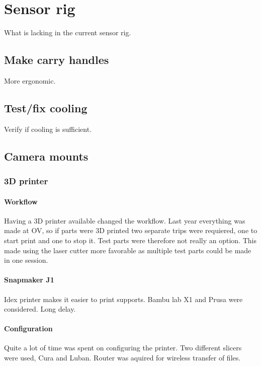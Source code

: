 \chapter{Sensor rig}
What is lacking in the current sensor rig.


\section{Make carry handles}
More ergonomic.

\section{Test/fix cooling}
Verify if cooling is sufficient.

\section{Camera mounts}

\subsection{3D printer}

\subsubsection{Workflow}
Having a 3D printer available changed the workflow.
Last year everything was made at OV, so if parts were 3D printed two separate trips were requiered, one to start print and one to stop it.
Test parts were therefore not really an option.
This made using the laser cutter more favorable as multiple test parts could be made in one session.

\subsubsection{Snapmaker J1}
Idex printer makes it easier to print supports.
Bambu lab X1 and Prusa were considered.
Long delay.

\subsubsection{Configuration}
Quite a lot of time was spent on configuring the printer.
Two different slicers were used, Cura and Luban.
Router was aquired for wireless transfer of files.
